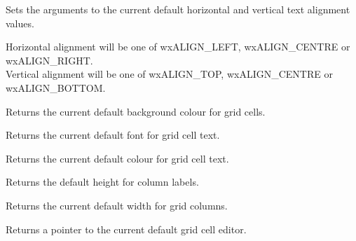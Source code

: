 
Sets the arguments to the current default horizontal and vertical text alignment
values.

Horizontal alignment will be one of wxALIGN\_LEFT, wxALIGN\_CENTRE or wxALIGN\_RIGHT. \\
Vertical alignment will be one of wxALIGN\_TOP, wxALIGN\_CENTRE or wxALIGN\_BOTTOM.



\label{wxgridgetdefaultcellbackgroundcolour}


Returns the current default background colour for grid cells.



\label{wxgridgetdefaultcellfont}


Returns the current default font for grid cell text.



\label{wxgridgetdefaultcelltextcolour}


Returns the current default colour for grid cell text.



\label{wxgridgetdefaultcollabelsize}


Returns the default height for column labels.



\label{wxgridgetdefaultcolsize}


Returns the current default width for grid columns.



\label{wxgridgetdefaulteditor}


Returns a pointer to the current default grid cell editor.

